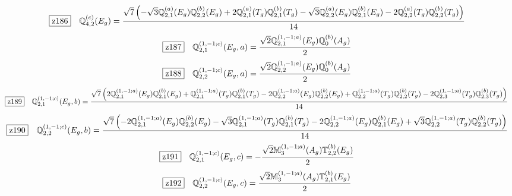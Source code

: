 \documentclass[fleqn,10pt,landscape]{jsarticle}
\begin{document}
\begin{dmath*}
\hspace*{3mm}\fbox{z186}\quad \mathbb{Q}_{4,2}^{(c)}(E_{g})=\frac{\sqrt{7} \left(- \sqrt{3} \mathbb{Q}_{2,1}^{(a)}(E_{g}) \mathbb{Q}_{2,2}^{(b)}(E_{g}) + 2 \mathbb{Q}_{2,1}^{(a)}(T_{g}) \mathbb{Q}_{2,1}^{(b)}(T_{g}) - \sqrt{3} \mathbb{Q}_{2,2}^{(a)}(E_{g}) \mathbb{Q}_{2,1}^{(b)}(E_{g}) - 2 \mathbb{Q}_{2,2}^{(a)}(T_{g}) \mathbb{Q}_{2,2}^{(b)}(T_{g})\right)}{14}
\end{dmath*}
\begin{dmath*}
\hspace*{3mm}\fbox{z187}\quad \mathbb{Q}_{2,1}^{(1,-1;c)}(E_{g},a)=\frac{\sqrt{2} \mathbb{Q}_{2,1}^{(1,-1;a)}(E_{g}) \mathbb{Q}_{0}^{(b)}(A_{g})}{2}
\end{dmath*}
\begin{dmath*}
\hspace*{3mm}\fbox{z188}\quad \mathbb{Q}_{2,2}^{(1,-1;c)}(E_{g},a)=\frac{\sqrt{2} \mathbb{Q}_{2,2}^{(1,-1;a)}(E_{g}) \mathbb{Q}_{0}^{(b)}(A_{g})}{2}
\end{dmath*}
\begin{dmath*}
\hspace*{3mm}\fbox{z189}\quad \mathbb{Q}_{2,1}^{(1,-1;c)}(E_{g},b)=\frac{\sqrt{7} \left(2 \mathbb{Q}_{2,1}^{(1,-1;a)}(E_{g}) \mathbb{Q}_{2,1}^{(b)}(E_{g}) + \mathbb{Q}_{2,1}^{(1,-1;a)}(T_{g}) \mathbb{Q}_{2,1}^{(b)}(T_{g}) - 2 \mathbb{Q}_{2,2}^{(1,-1;a)}(E_{g}) \mathbb{Q}_{2,2}^{(b)}(E_{g}) + \mathbb{Q}_{2,2}^{(1,-1;a)}(T_{g}) \mathbb{Q}_{2,2}^{(b)}(T_{g}) - 2 \mathbb{Q}_{2,3}^{(1,-1;a)}(T_{g}) \mathbb{Q}_{2,3}^{(b)}(T_{g})\right)}{14}
\end{dmath*}
\begin{dmath*}
\hspace*{3mm}\fbox{z190}\quad \mathbb{Q}_{2,2}^{(1,-1;c)}(E_{g},b)=\frac{\sqrt{7} \left(- 2 \mathbb{Q}_{2,1}^{(1,-1;a)}(E_{g}) \mathbb{Q}_{2,2}^{(b)}(E_{g}) - \sqrt{3} \mathbb{Q}_{2,1}^{(1,-1;a)}(T_{g}) \mathbb{Q}_{2,1}^{(b)}(T_{g}) - 2 \mathbb{Q}_{2,2}^{(1,-1;a)}(E_{g}) \mathbb{Q}_{2,1}^{(b)}(E_{g}) + \sqrt{3} \mathbb{Q}_{2,2}^{(1,-1;a)}(T_{g}) \mathbb{Q}_{2,2}^{(b)}(T_{g})\right)}{14}
\end{dmath*}
\begin{dmath*}
\hspace*{3mm}\fbox{z191}\quad \mathbb{Q}_{2,1}^{(1,-1;c)}(E_{g},c)=- \frac{\sqrt{2} \mathbb{M}_{3}^{(1,-1;a)}(A_{g}) \mathbb{T}_{2,2}^{(b)}(E_{g})}{2}
\end{dmath*}
\begin{dmath*}
\hspace*{3mm}\fbox{z192}\quad \mathbb{Q}_{2,2}^{(1,-1;c)}(E_{g},c)=\frac{\sqrt{2} \mathbb{M}_{3}^{(1,-1;a)}(A_{g}) \mathbb{T}_{2,1}^{(b)}(E_{g})}{2}
\end{dmath*}
\end{document}
